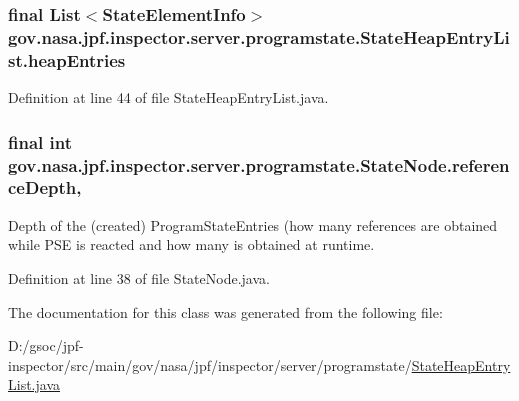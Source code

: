 \subsubsection[{\texorpdfstring{heap\+Entries}{heapEntries}}]{\setlength{\rightskip}{0pt plus 5cm}final List$<${\bf State\+Element\+Info}$>$ gov.\+nasa.\+jpf.\+inspector.\+server.\+programstate.\+State\+Heap\+Entry\+List.\+heap\+Entries\hspace{0.3cm}{\ttfamily [private]}}\hypertarget{classgov_1_1nasa_1_1jpf_1_1inspector_1_1server_1_1programstate_1_1_state_heap_entry_list_aa3db81744d71bbff39d4af64b1f30a1a}{}\label{classgov_1_1nasa_1_1jpf_1_1inspector_1_1server_1_1programstate_1_1_state_heap_entry_list_aa3db81744d71bbff39d4af64b1f30a1a}


Definition at line 44 of file State\+Heap\+Entry\+List.\+java.

\subsubsection[{\texorpdfstring{reference\+Depth}{referenceDepth}}]{\setlength{\rightskip}{0pt plus 5cm}final int gov.\+nasa.\+jpf.\+inspector.\+server.\+programstate.\+State\+Node.\+reference\+Depth\hspace{0.3cm}{\ttfamily [protected]}, {\ttfamily [inherited]}}\hypertarget{classgov_1_1nasa_1_1jpf_1_1inspector_1_1server_1_1programstate_1_1_state_node_a55683618625dae46e8aa68d95811d6bb}{}\label{classgov_1_1nasa_1_1jpf_1_1inspector_1_1server_1_1programstate_1_1_state_node_a55683618625dae46e8aa68d95811d6bb}


Depth of the (created) Program\+State\+Entries (how many references are obtained while P\+SE is reacted and how many is obtained at runtime. 



Definition at line 38 of file State\+Node.\+java.



The documentation for this class was generated from the following file\+:\begin{DoxyCompactItemize}
\item 
D\+:/gsoc/jpf-\/inspector/src/main/gov/nasa/jpf/inspector/server/programstate/\hyperlink{_state_heap_entry_list_8java}{State\+Heap\+Entry\+List.\+java}\end{DoxyCompactItemize}
